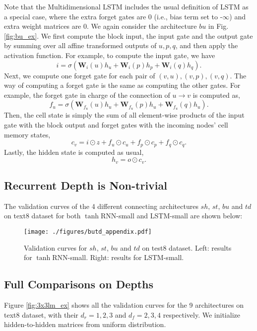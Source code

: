 Note that the Multidimensional LSTM includes the usual definition of LSTM as a special case, where the extra forget gates are 0 (i.e., bias term set to -$\infty$) and extra weight matrices are 0. We again consider the architecture $bu$ in Fig. \ref{fig:bu_ex}. We first compute the block input, the input gate and the output gate by summing over all affine transformed outputs of $u,p,q$, and then apply the activation function. For example, to compute the input gate, we have
\begin{equation*}
    i = \sigma\left(\textbf{W}_i(u)h_u+\textbf{W}_i(p)h_p+\textbf{W}_i(q)h_q\right).
\end{equation*}
Next, we compute one forget gate for each pair of $(v,u), (v,p), (v,q)$. The way of computing a forget gate is the same as computing the other gates. For example, the forget gate in charge of the connection of $u \to v$ is computed as,
\begin{equation*}
    f_u= \sigma\left(\textbf{W}_{f_u}(u)h_u+\textbf{W}_{f_u}(p)h_u+\textbf{W}_{f_u}(q)h_u\right).
\end{equation*}
Then, the cell state is simply the sum of all element-wise products of the input gate with the block output and forget gates with the incoming nodes' cell memory states,
\begin{equation*}
    c_v = i \odot z + f_u \odot c_u+f_p \odot c_p+f_q \odot c_q.
\end{equation*}
Lastly, the hidden state is computed as usual,
\begin{equation*}
h_v = o \odot c_v.
\end{equation*}




\subsection{Recurrent Depth is Non-trivial}
\label{sec:exp_dr_nontrivial}
The validation curves of the 4 different connecting
architectures $sh$, $st$, $bu$ and $td$ on text8
dataset for both $\tanh$RNN-small and LSTM-small are shown below:
\begin{figure}[htp]
\center
\texttt{[image: ./figures/butd\_appendix.pdf]}
\vspace{-10pt}
\caption{Validation curves for $sh$, $st$, $bu$ and $td$ on test8 dataset.
Left: results for $\tanh$RNN-small. Right: results for LSTM-small.}
\label{fig:butd_ex}
\end{figure}

\subsection{Full Comparisons on Depths}
\label{sec:full_com}
Figure \ref{fig:3x3lm_ex}
shows all the validation curves for the 9 architectures on text8 dataset, with
their $d_r = 1, 2, 3$ and $d_f = 2, 3, 4$ respectively.
We initialize hidden-to-hidden
matrices from uniform distribution.


